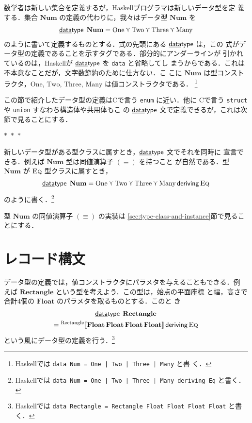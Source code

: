 \documentclass[a5paper,twoside,fleqn,draft]{jsbook}
\def\[{[\![}
\def\]{]\!]}
\newcommand{\separator}{\begin{center}$*$~$*$~$*$\end{center}}
\newcommand{\programminglanguage}[1]{\textsf{#1}}
\newcommand{\clang}{\programminglanguage{C}}
\newcommand{\haskell}{\programminglanguage{Haskell}}
\newcommand{\keyword}[1]{{\underline{\textbf{#1}}}}
\newcommand{\code}[1]{\texttt{#1}}
\newcommand{\mKeyword}[1]{\mathsf{#1}}
\newcommand{\mKeywordUnderline}[1]{\text{\underline{\textsf{#1}}}}
\newcommand{\mDataTypeKeyword}{\mKeywordUnderline{data}\mKeyword{type}}
\newcommand{\mDerivingKeyword}{\mKeyword{deriving}}
\DeclareMathOperator{\mDataType}{\mDataTypeKeyword}
\DeclareMathOperator{\mDeriving}{\mDerivingKeyword}
\newcommand{\mSpecialConstant}[1]{\textrm{#1}}
\newcommand{\mNumOne}{\mSpecialConstant{One}}
\newcommand{\mNumTwo}{\mSpecialConstant{Two}}
\newcommand{\mNumThree}{\mSpecialConstant{Three}}
\newcommand{\mNumMany}{\mSpecialConstant{Many}}
\DeclareMathOperator{\mValueOr}{\curlyvee}
\newcommand{\mSet}[1]{\mathbf{#1}}
\newcommand{\mType}[1]{\mathbf{#1}} %
\newcommand{\mFloatType}{\mType{Float}}
\newcommand{\mValueConstructor}[1]{\mathrm{#1}}
\newcommand{\mValueWith}[2]{{}^\mValueConstructor{#1}\[#2\]}
\newcommand{\mTypeClass}[1]{\textsc{#1}} %
\newcommand{\mEqTypeClass}{\mTypeClass{Eq}}
\begin{document}
数学者は新しい集合を定義するが，\haskell プログラマは新しいデータ型を定
義する．集合 $\mSet{Num}$ の定義の代わりに，我々はデータ型
$\mType{Num}$ を
\begin{equation}
  \mDataType\;\mType{Num}
  =\mNumOne\mValueOr\mNumTwo\mValueOr\mNumThree\mValueOr\mNumMany
\end{equation}
のように書いて定義するものとする．式の先頭にある $\mDataType$ は，この
式がデータ型の定義であることを示すタグである．部分的にアンダーラインが
引かれているのは，\haskell が $\mDataType$ を \code{data} と省略してし
まうからである．これは不本意なことだが，文字数節約のために仕方ない．こ
こに $\mSet{Num}$ は型コンストラクタ，$\mNumOne$, $\mNumTwo$,
$\mNumThree$, $\mNumMany$ は値コンストラクタである．
\footnote{\haskell では \code{data Num = One | Two | Three | Many} と書
  く．}


この節で紹介したデータ型の定義は\clang で言う \code{enum} に近い．他に
\clang で言う \code{struct} や \code{union} すなわち構造体や共用体もこ
の $\mDataType$ 文で定義できるが，これは次節で見ることにする．

\separator

新しいデータ型がある型クラスに属すとき，$\mDataType$ 文でそれを同時に
宣言できる．例えば $\mType{Num}$ 型は同値演算子 $(\equiv)$ を持つこと
が自然である．型 $\mType{Num}$ が $\mEqTypeClass$ 型クラスに属すとき，
\begin{equation}
  \mDataType\;
  \mType{Num}
  =\mNumOne\mValueOr\mNumTwo\mValueOr\mNumThree\mValueOr\mNumMany
  \mDeriving\mEqTypeClass
\end{equation}
のように書く．\footnote{\haskell では \code{data Num = One | Two |
Three | Many deriving Eq} と書く．}

型 $\mType{Num}$ の同値演算子 $(\equiv)$ の実装は
\ref{sec:type-class-and-instance}節で見ることにする．

\section{レコード構文}

データ型の定義では，値コンストラクタにパラメタを与えることもできる．例
えば $\mType{Rectangle}$ という型を考えよう．この型は，始点の平面座標
と幅，高さで合計4個の $\mFloatType$ のパラメタを取るものとする．このと
き
\begin{multline}
  \label{eq:rectangle}
  \mDataType\;
  \mType{Rectangle}\\
  =\mValueWith{Rectangle}
  {\mFloatType\,\mFloatType\,\mFloatType\,\mFloatType}
  \mDeriving\mEqTypeClass
\end{multline}
という風にデータ型の定義を行う．\footnote{\haskell では \code{data
Rectangle = Rectangle Float Float Float Float} と書く．}
\end{document}
